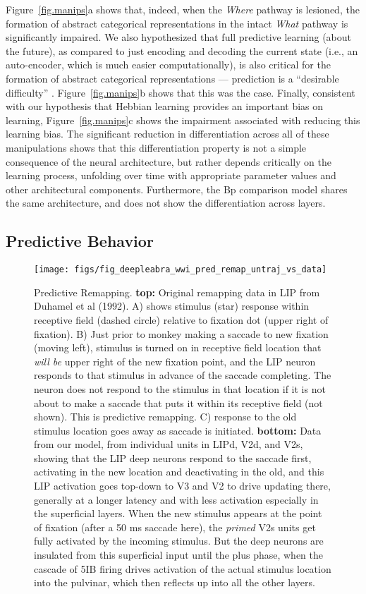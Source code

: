 \documentclass[11pt,twoside]{article}
\newif\myifpdf
\begin{document}
Figure~\ref{fig.manips}a shows that, indeed, when the \emph{Where} pathway is lesioned, the formation of abstract categorical representations in the intact \emph{What} pathway is significantly impaired.  We also hypothesized that full predictive learning (about the future), as compared to just encoding and decoding the current state (i.e., an auto-encoder, which is much easier computationally), is also critical for the formation of abstract categorical representations --- prediction is a ``desirable difficulty'' \citep{Bjork94}.  Figure~\ref{fig.manips}b shows that this was the case.  Finally, consistent with our hypothesis that Hebbian learning provides an important bias on learning, Figure~\ref{fig.manips}c shows the impairment associated with reducing this learning bias.  The significant reduction in differentiation across all of these manipulations shows that this differentiation property is not a simple consequence of the neural architecture, but rather depends critically on the learning process, unfolding over time with appropriate parameter values and other architectural components.  Furthermore, the Bp comparison model shares the same architecture, and does not show the differentiation across layers.

\subsection{Predictive Behavior}

\begin{figure}
  \centering\texttt{[image: figs/fig\_deepleabra\_wwi\_pred\_remap\_untraj\_vs\_data]}
  \caption{\footnotesize Predictive Remapping.  {\bf top:} Original remapping data in LIP from Duhamel et al (1992).  A) shows stimulus (star) response within receptive field (dashed circle) relative to fixation dot (upper right of fixation).  B) Just prior to monkey making a saccade to new fixation (moving left), stimulus is turned on in receptive field location that \emph{will be} upper right of the new fixation point, and the LIP neuron responds to that stimulus in advance of the saccade completing.  The neuron does not respond to the stimulus in that location if it is not about to make a saccade that puts it within its receptive field (not shown).  This is predictive remapping.  C) response to the old stimulus location goes away as saccade is initiated.  {\bf bottom:} Data from our model, from individual units in LIPd, V2d, and V2s, showing that the LIP deep neurons respond to the saccade first, activating in the new location and deactivating in the old, and this LIP activation goes top-down to V3 and V2 to drive updating there, generally at a longer latency and with less activation especially in the superficial layers.  When the new stimulus appears at the point of fixation (after a 50 ms saccade here), the \emph{primed} V2s units get fully activated by the incoming stimulus.  But the deep neurons are insulated from this superficial input until the plus phase, when the cascade of 5IB firing drives activation of the actual stimulus location into the pulvinar, which then reflects up into all the other layers.}
  \label{fig.remap_units}
\end{figure}
\end{document}
